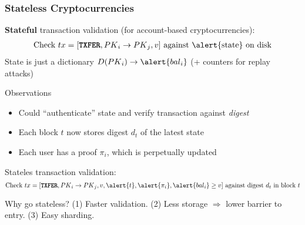 \begin{frame}
    \frametitle{Stateless Cryptocurrencies}

    \footnotesize
    \pause
    \textbf{Stateful} transaction validation (for account-based cryptocurrencies)\pause:
    \begin{align*}
    \text{Check}\ \tx=[\txfer, \PK_i \rightarrow \PK_j, v]\ \text{against \alert{state} on disk}
    \end{align*}
    \pause
    State is just a dictionary $D(\PK_i)\rightarrow \alert{\bal_i}$ (+ counters for replay attacks)\pause
    \begin{alertblock}{Observations}
        \begin{itemize}
        \item Could ``authenticate'' state and verify transaction against \textit{digest}~\cite{Miller12,Todd16,Buterin17,RMCI17}\pause
        \item Each block $t$ now stores digest \alert{$d_t$} of the latest state\pause
        \item Each user has a proof \alert{$\pi_i$}, which is perpetually updated\pause
        \end{itemize}
    \end{alertblock}

    \alert{Stateles} transaction validation\pause:
    \begin{equation*}
    \text{Check}\ \tx=[\txfer, \PK_i \rightarrow \PK_j, v, \alert{t}, \alert{\pi_i}, \alert{\bal_i} \ge v]\ \text{against digest}\ d_t\ \text{in block}\ t
    \end{equation*}
    \pause
    \begin{exampleblock}{Why go stateless?}
        \pause
        (1) Faster validation.\pause\xspace
        (2) Less storage $\Rightarrow$ lower barrier to entry.\pause\xspace
        (3) Easy sharding.
    \end{exampleblock}
\end{frame}

